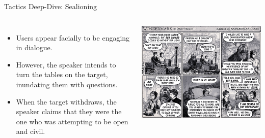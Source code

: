 \documentclass[nobackground,dvipsnames,table]{beamer}
\begin{document}
\begin{frame}{Tactics Deep-Dive: Sealioning}
    \begin{columns}
            \footnotesize
            \begin{itemize}
                \item Users appear facially to be engaging in dialogue.
                \item However, the speaker intends to turn the tables on the target, inundating them with questions.
                \item When the target withdraws, the speaker claims that they were the one who was attempting to be open and civil.
            \end{itemize}
            \includegraphics[width=\textwidth]{sealioning-comic}
    \end{columns}
\end{frame}
\end{document}
